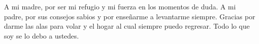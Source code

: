 \chapter*{}
\thispagestyle{empty}
\vspace*{5cm}

\begin{flushright}
\begin{minipage}{0.75\textwidth}
\raggedleft
A mi madre, por ser mi refugio y mi fuerza en los momentos de duda.
A mi padre, por sus consejos sabios y por enseñarme a levantarme siempre.
Gracias por darme las alas para volar y el hogar al cual siempre puedo regresar.
Todo lo que soy se lo debo a ustedes.
\end{minipage}
\end{flushright}
